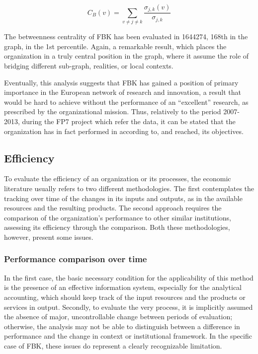 \[
	C_B (v) =
		\sum_{v \neq j \neq k}
			\frac {\sigma_{j,k} (v)}{\sigma_{j,k}}
\]

The betweenness centrality of FBK has been evaluated in 1644274, 168th in the graph, in the 1st percentile. Again, a remarkable result, which places the organization in a truly central position in the graph, where it assume the role of bridging different sub-graph, realities, or local contexts. 

Eventually, this analysis suggests that FBK has gained a position of primary importance in the European network of research and innovation, a result that would be hard to achieve without the performance of an \enquote{excellent} research, as prescribed by the organizational mission. Thus, relatively to the period 2007-2013, during the FP7 project which refer the data, it can be stated that the organization has in fact performed in according to, and reached, its objectives. 

\subsection{Efficiency}

To evaluate the efficiency of an organization or its processes, the economic literature usually refers to two different methodologies. The first contemplates the tracking over time of the changes in its inputs and outputs, as in the available resources and the resulting products. The second approach requires the comparison of the organization's performance to other similar institutions, assessing its efficiency through the comparison. Both these methodologies, however, present some issues.

\subsubsection{Performance comparison over time}

In the first case, the basic necessary condition for the applicability of this method is the presence of an effective information system, especially for the analytical accounting, which should keep track of the input resources and the products or services in output. Secondly, to evaluate the very process, it is implicitly assumed the absence of major, uncontrollable change between periods of evaluation; otherwise, the analysis may not be able to distinguish between a difference in performance and the change in context or institutional framework. In the specific case of FBK, these issues do represent a clearly recognizable limitation. 


